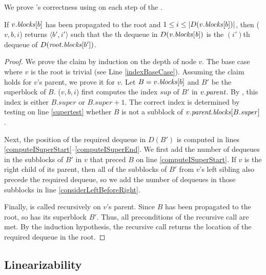 
We prove 's correctness using  on each step of the .

\begin{lemma}\label{lem::indexDequeue}
If $v.\mbox{\textit{blocks}}[b]$ has been propagated to the root and $1\leq i\leq |D(v.\mbox{\textit{blocks}}[b])|$, 
 then ($v, b, i$) returns $\langle b',i' \rangle$ such that the th dequeue in $D(\mbox{\textnormal{\textit{v}}}.\mbox{\textit{blocks}}[\mbox{\textnormal{\textit{b}}}])$ is the $(i')$th dequeue of $D(\mbox{\textnormal{\textit{root}}}.\mbox{\textit{blocks}}[b'])$.
\end{lemma}
\begin{proof}
We prove the claim by induction on the depth of node $v$. The base case where $v$ is the root is trivial (see Line \ref{indexBaseCase}).
Assuming the claim holds for $v$'s parent, we prove it for $v$.
Let $B=v.\mbox{\textit{blocks}}[b]$ and $B'$ be the superblock of $B$.
($v, b, i$) first computes the index $sup$ of $B'$ in $v.\mbox{\textit{parent}}$.
By , this index is either $B.super$ or $B.super+1$.
The correct index is determined by testing on line \ref{supertest} whether $B$ is not a subblock of $v.\mbox{\textit{parent.blocks}}[B.\mbox{\textit{super}}]$.

Next, the position of the required dequeue in $D(B')$ is computed in 
lines \ref{computeISuperStart}--\ref{computeISuperEnd}. 
We first add the number of dequeues in the subblocks of $B'$ in $v$ that preced $B$ on line \ref{computeISuperStart}.
If $v$ is the right child of its parent, then all of the subblocks of $B'$ from $v$'s left sibling
also precede the required dequeue, so we add the number of dequeues in those subblocks in line \ref{considerLeftBeforeRight}.

Finally,  is called recursively on $v$'s parent.
Since $B$ has been propagated to the root, so has its superblock $B'$.
Thus, all preconditions of the recursive call are met.
By the induction hypothesis, the recursive call returns the location of the required dequeue in the root.\end{proof}

\subsection{Linearizability}
\label{sec::linearizability}

